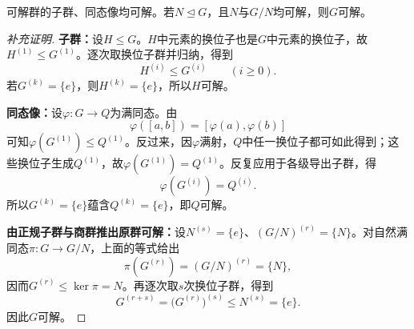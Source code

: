 \begin{proposition}\label{p2:solvable-extension}
可解群的子群、同态像均可解。若$N\trianglelefteq G$，且$N$与$G/N$均可解，则$G$可解。
\end{proposition}
\begin{proof}[补充证明]
\textbf{子群：}设$H\leq G$。$H$中元素的换位子也是$G$中元素的换位子，故$H^{(1)}\leq G^{(1)}$。逐次取换位子群并归纳，得到
\[
H^{(i)}\leq G^{(i)}\qquad(i\geq0).
\]
若$G^{(k)}=\{e\}$，则$H^{(k)}=\{e\}$，所以$H$可解。

\textbf{同态像：}设$\varphi:G\to Q$为满同态。由
\[
\varphi([a,b])=[\varphi(a),\varphi(b)]
\]
可知$\varphi(G^{(1)})\leq Q^{(1)}$。反过来，因$\varphi$满射，$Q$中任一换位子都可如此得到；这些换位子生成$Q^{(1)}$，故$\varphi(G^{(1)})=Q^{(1)}$。反复应用于各级导出子群，得
\[
\varphi(G^{(i)})=Q^{(i)}.
\]
所以$G^{(k)}=\{e\}$蕴含$Q^{(k)}=\{e\}$，即$Q$可解。

\textbf{由正规子群与商群推出原群可解：}设$N^{(s)}=\{e\}$、$(G/N)^{(r)}=\{N\}$。对自然满同态$\pi:G\to G/N$，上面的等式给出
\[
\pi(G^{(r)})=(G/N)^{(r)}=\{N\},
\]
因而$G^{(r)}\leq\ker\pi=N$。再逐次取$s$次换位子群，得到
\[
G^{(r+s)}=\bigl(G^{(r)}\bigr)^{(s)}\leq N^{(s)}=\{e\}.
\]
因此$G$可解。
\end{proof}

